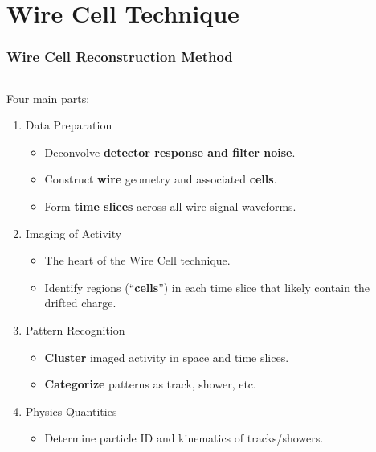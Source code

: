 \section{Wire Cell Technique}

\begin{frame}
\end{frame}


\begin{frame}[fragile]
  \frametitle{Wire Cell Reconstruction Method}
  \begin{columns}
    \begin{column}{0.7\textwidth}
      Four main parts:
      \begin{enumerate}
      \item<2> Data Preparation
        \begin{itemize}        \scriptsize
        \item Deconvolve \textbf{detector response and filter noise}.
        \item Construct \textbf{wire} geometry and associated \textbf{cells}.
        \item Form \textbf{time slices} across all wire signal waveforms.
        \end{itemize}
      \item<3> Imaging of Activity
        \begin{itemize}        \scriptsize
        \item The heart of the Wire Cell technique.
        \item Identify regions (``\textbf{cells}'') in each time slice that likely contain the drifted charge.
        \end{itemize}
      \item<4> Pattern Recognition 
        \begin{itemize}         \scriptsize
        \item \textbf{Cluster} imaged activity in space and time slices.
        \item \textbf{Categorize} patterns as track, shower, etc.
        \end{itemize}
      \item<5> Physics Quantities
        \begin{itemize}         \scriptsize
        \item Determine particle ID and kinematics of tracks/showers.
        \end{itemize}
      \end{enumerate}
    \end{column}
    \begin{column}{0.3\textwidth}
      \begin{center}
        \vspace{-10mm}
        \resizebox{!}{\textheight}{}
      \end{center}
    \end{column}
  \end{columns}

\end{frame}

